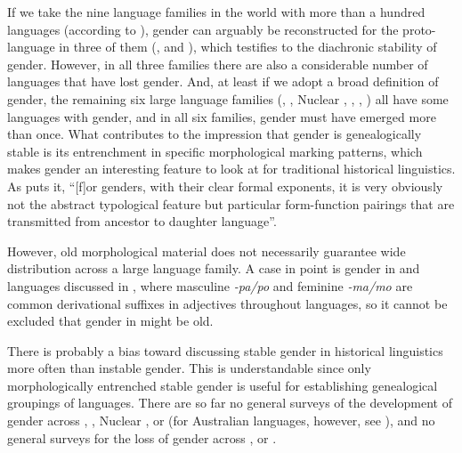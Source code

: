 \documentclass[output=collectionpaper]{langsci/langscibook}
\begin{document}
If we take the nine language families in the world with more than a hundred languages (according to \citealt{Hammarstroem2018}), gender can arguably be reconstructed for the proto-language in three of them (,  and ), which testifies to the diachronic stability of gender. However, in all three families there are also a considerable number of languages that have lost gender. And, at least if we adopt a broad definition of gender, the remaining six large language families (, , Nuclear , , , ) all have some languages with gender, and in all six families, gender must have emerged more than once. What contributes to the impression that gender is genealogically stable is its entrenchment in specific morphological marking patterns, which makes gender an interesting feature to look at for traditional historical linguistics. As \cite[303]{Nichols2003} puts it, ``[f]or genders, with their clear formal exponents, it is very obviously not the abstract typological feature but particular form-function pairings that are transmitted from ancestor to daughter language''.

However, old morphological material does not necessarily guarantee wide distribution across a large language family. A case in point is gender in  and  languages discussed in , where masculine \textit{-pa/po} and feminine \textit{-ma/mo} are common derivational suffixes in adjectives throughout  languages, so it cannot be excluded that gender in  might be old.

There is probably a bias toward discussing stable gender in historical linguistics more often than instable gender. This is understandable since only morphologically entrenched stable gender is useful for establishing genealogical groupings of languages. There are so far no general surveys of the development of gender across , , Nuclear ,  or  (for Australian languages, however, see \citealt[449--514]{Dixon2002}), and no general surveys for the loss of gender across ,  or .
\end{document}
